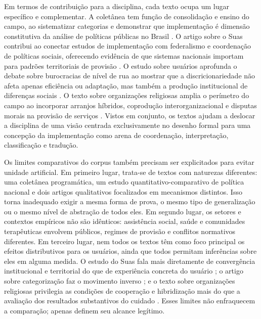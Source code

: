 \documentclass[12pt,a4paper]{article}
\begin{document}
Em termos de contribuição para a disciplina, cada texto ocupa um lugar específico e complementar. A coletânea tem função de consolidação e ensino do campo, ao sistematizar categorias e demonstrar que implementação é dimensão constitutiva da análise de políticas públicas no Brasil \parencite{lotta2019_teorias_analises}. O artigo sobre o Suas contribui ao conectar estudos de implementação com federalismo e coordenação de políticas sociais, oferecendo evidência de que sistemas nacionais importam para padrões territoriais de provisão \parencite{bichir2020_sistemas_nacionais}. O estudo sobre usuários aprofunda o debate sobre burocracias de nível de rua ao mostrar que a discricionariedade não afeta apenas eficiência ou adaptação, mas também a produção institucional de diferenças sociais \parencite{lotta2020_categorizando_usuarios}. O texto sobre organizações religiosas amplia o perímetro do campo ao incorporar arranjos híbridos, coprodução interorganizacional e disputas morais na provisão de serviços \parencite{lotta2023_jesus_speaks}. Vistos em conjunto, os textos ajudam a deslocar a disciplina de uma visão centrada exclusivamente no desenho formal para uma concepção da implementação como arena de coordenação, interpretação, classificação e tradução.

Os limites comparativos do corpus também precisam ser explicitados para evitar unidade artificial. Em primeiro lugar, trata-se de textos com naturezas diferentes: uma coletânea programática, um estudo quantitativo-comparativo de política nacional e dois artigos qualitativos focalizados em mecanismos distintos. Isso torna inadequado exigir a mesma forma de prova, o mesmo tipo de generalização ou o mesmo nível de abstração de todos eles. Em segundo lugar, os setores e contextos empíricos não são idênticos: assistência social, saúde e comunidades terapêuticas envolvem públicos, regimes de provisão e conflitos normativos diferentes. Em terceiro lugar, nem todos os textos têm como foco principal os efeitos distributivos para os usuários, ainda que todos permitam inferências sobre eles em alguma medida. O estudo do Suas fala mais diretamente de convergência institucional e territorial do que de experiência concreta do usuário \parencite{bichir2020_sistemas_nacionais}; o artigo sobre categorização faz o movimento inverso \parencite{lotta2020_categorizando_usuarios}; e o texto sobre organizações religiosas privilegia as condições de cooperação e hibridização mais do que a avaliação dos resultados substantivos do cuidado \parencite{lotta2023_jesus_speaks}. Esses limites não enfraquecem a comparação; apenas definem seu alcance legítimo.
\end{document}
